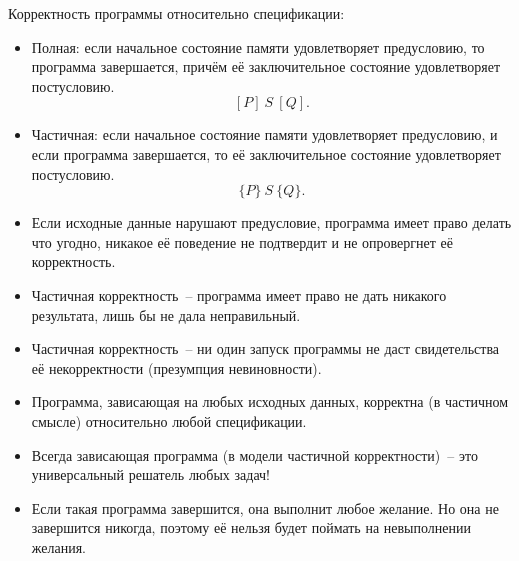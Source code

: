 \documentclass[landscape]{slides}
\begin{document}
\newcommand{\true}{\mathbf{True}}
\newcommand{\false}{\mathbf{False}}
\newcommand{\implies}{\Rightarrow}

\begin{slide}
Корректность программы относительно спецификации:
\begin{itemize}
\item Полная: если начальное состояние памяти удовлетворяет предусловию,
        то программа завершается, причём её заключительное состояние
        удовлетворяет постусловию.
        \[
                [P] \  S \  [Q] .
        \]
\item Частичная: если начальное состояние памяти удовлетворяет предусловию,
        и если программа завершается, то её заключительное состояние
        удовлетворяет постусловию.
        \[
                \{P\} \  S \  \{Q\} .
        \]
\item Если исходные данные нарушают предусловие, программа имеет право
делать что угодно, никакое её поведение не подтвердит и не опровергнет
её корректность.
\end{itemize}
\end{slide}

\begin{slide}
\begin{itemize}
\item Частичная корректность~-- программа имеет право не дать
никакого результата, лишь бы не дала неправильный.
\item Частичная корректность~-- ни один запуск программы не даст свидетельства
её некорректности (презумпция невиновности).
\item Программа, зависающая на любых исходных данных, корректна (в частичном смысле)
относительно любой спецификации.
\item Всегда зависающая программа (в модели частичной корректности)~-- это универсальный
решатель любых задач!
\item Если такая программа завершится, она выполнит любое желание. Но она не завершится
никогда, поэтому её нельзя будет поймать на невыполнении желания.
\end{itemize}
\end{slide}
\end{document}
